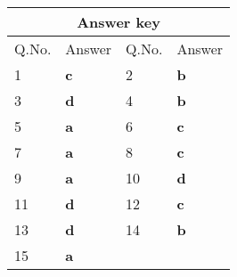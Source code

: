 \begin{table}[H]
	\centering
	
	\begin{tabular}{|p{1.5cm}|p{1.5cm}||p{1.5cm}|p{1.5cm}|}
		\hline
		\multicolumn{4}{|c|}{\textbf{Answer key}}\\\hline\hline
		\rowcolor{ocrel}Q.No.&Answer&Q.No.&Answer\\\hline
		1&\textbf{c}&2&\textbf{b}\\\hline 
		3&\textbf{d}&4&\textbf{b}\\\hline
		5&\textbf{a}&6&\textbf{c}\\\hline
		7&\textbf{a}&8&\textbf{c}\\\hline
		9&\textbf{a}&10&\textbf{d}\\\hline
		11&\textbf{d}&12&\textbf{c}\\\hline
		13&\textbf{d}&14&\textbf{b}\\\hline
		15&\textbf{a}&&\\\hline
	\end{tabular}
\end{table}

